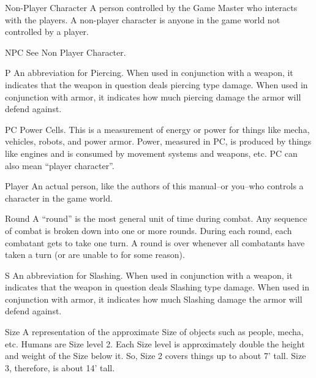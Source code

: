 \documentclass[twoside]{book}
\begin{document}
              
               Non-Player Character   
                  A person controlled by the Game Master who
                 interacts with the players. A non-player character is
                 anyone in the game world not controlled by a player.
                 
              
              
               NPC   
                See Non Player Character.   
              
              
               P   
                  An abbreviation for Piercing. When used in
                 conjunction with a weapon, it indicates that the weapon
                 in question deals piercing type damage. When used in
                 conjunction with armor, it indicates how much piercing
                 damage the armor will defend against. 
              
              
               PC   
                  Power Cells. This is a measurement of energy or
                 power for things like mecha, vehicles, robots, and power
                 armor. Power, measured in PC, is produced by things like
                 engines and is consumed by movement systems and weapons,
                 etc. PC can also mean “player character”.
                 
              
              
               Player   
                  An actual person, like the authors of this
                 manual–or you–who controls a character in
                 the game world. 
              
              
               Round   
                  A “round” is the most general unit of
                 time during combat. Any sequence of combat is broken
                 down into one or more rounds. During each round, each
                 combatant gets to take one turn. A round is over
                 whenever all combatants have taken a turn (or are unable
                 to for some reason). 
              
              
               S   
                  An abbreviation for Slashing. When used in
                 conjunction with a weapon, it indicates that the weapon
                 in question deals Slashing type damage. When used in
                 conjunction with armor, it indicates how much Slashing
                 damage the armor will defend against. 
              
              
               Size   
                  A representation of the approximate Size of
                 objects such as people, mecha, etc. Humans are Size
                 level 2. Each Size level is approximately double the
                 height and weight of the Size below it. So, Size 2
                 covers things up to about 7’ tall. Size 3,
                 therefore, is about 14’ tall. 
              
\end{document}
